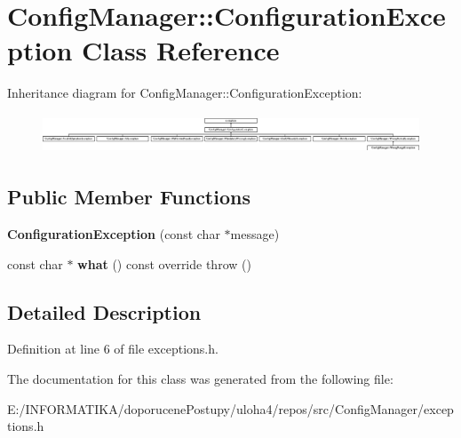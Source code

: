 \hypertarget{class_config_manager_1_1_configuration_exception}{}\section{Config\+Manager\+:\+:Configuration\+Exception Class Reference}
\label{class_config_manager_1_1_configuration_exception}
Inheritance diagram for Config\+Manager\+:\+:Configuration\+Exception\+:\begin{figure}[H]
\begin{center}
\leavevmode
\includegraphics[height=1.172161cm]{class_config_manager_1_1_configuration_exception}
\end{center}
\end{figure}
\subsection*{Public Member Functions}
\begin{DoxyCompactItemize}
\item 
{\bfseries Configuration\+Exception} (const char $\ast$message)\hypertarget{class_config_manager_1_1_configuration_exception_a7ab971ae1aa991968064f7414f233afd}{}\label{class_config_manager_1_1_configuration_exception_a7ab971ae1aa991968064f7414f233afd}

\item 
const char $\ast$ {\bfseries what} () const  override  throw ()\hypertarget{class_config_manager_1_1_configuration_exception_a2896099b9b4ced84a7359136105e9937}{}\label{class_config_manager_1_1_configuration_exception_a2896099b9b4ced84a7359136105e9937}

\end{DoxyCompactItemize}


\subsection{Detailed Description}


Definition at line 6 of file exceptions.\+h.



The documentation for this class was generated from the following file\+:\begin{DoxyCompactItemize}
\item 
E\+:/\+I\+N\+F\+O\+R\+M\+A\+T\+I\+K\+A/doporucene\+Postupy/uloha4/repos/src/\+Config\+Manager/exceptions.\+h\end{DoxyCompactItemize}
